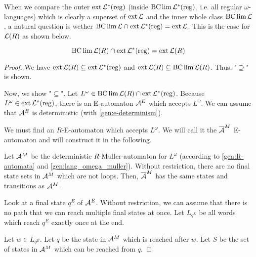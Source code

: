 When we compare the outer $\operatorname{ext} \mathcal{L}^*(\textup{\textrm{reg}})$ (inside $\operatorname{BC} \lim \mathcal{L}^*(\textup{\textrm{reg}})$, i.e. all regular $\omega$-languages) which is clearly a superset of $\operatorname{ext} \mathcal{L}$ and the inner whole class $\operatorname{BC} \lim \mathcal{L}$, a natural question is wether $\operatorname{BC} \lim \mathcal{L} \cap \operatorname{ext} \mathcal{L}^*(\textup{\textrm{reg}}) = \operatorname{ext} \mathcal{L}$. This is the case for $\mathcal{L}(R)$ as shown below.

\begin{lemma}
\label{gen:R-bclim-cap-ext}
\[ \operatorname{BC} \lim \mathcal{L}(R) \cap \operatorname{ext} \mathcal{L}^*(\textup{\textrm{reg}}) = \operatorname{ext} \mathcal{L}(R) \]

\begin{proof}
We have $\operatorname{ext} \mathcal{L}(R) \subseteq \operatorname{ext} \mathcal{L}^*(\textup{\textrm{reg}})$ and $\operatorname{ext} \mathcal{L}(R) \subseteq \operatorname{BC} \lim \mathcal{L}(R)$. Thus, "$\supseteq$" is shown.

Now, we show "$\subseteq$". Let $L^\omega \in \operatorname{BC} \lim \mathcal{L}(R) \cap \operatorname{ext} \mathcal{L}^*(\textup{\textrm{reg}})$. Because $L^\omega \in \operatorname{ext} \mathcal{L}^*(\textup{\textrm{reg}})$, there is an E-automaton $\mathcal{A}^E$ which accepts $L^\omega$. We can assume that $\mathcal{A}^E$ is deterministic (with \cref{gen:e-determinism}).

We must find an $R$-E-automaton which accepts $L^\omega$. We will call it the $\overline{\mathcal{A}}^M$ E-automaton and will construct it in the following.

Let $\mathcal{A}^M$ be the deterministic $R$-Muller-automaton for $L^\omega$ (according to \cref{gen:R-automata} and \cref{gen:lang_omega_muller}). Without restriction, there are no final state sets in $\mathcal{A}^M$ which are not loops. Then, $\overline{\mathcal{A}}^M$ has the same states and transitions as $\mathcal{A}^M$.

Look at a final state $q^E$ of $\mathcal{A}^E$. Without restriction, we can assume that there is no path that we can reach multiple final states at once. Let $L_{q^E}$ be all words which reach $q^E$ exactly once at the end.

Let $w \in L_{q^E}$.
Let $q$ be the state in $\mathcal{A}^M$ which is reached after $w$. Let $S$ be the set of states in $\mathcal{A}^M$ which can be reached from $q$.


\end{proof}
\end{lemma}
